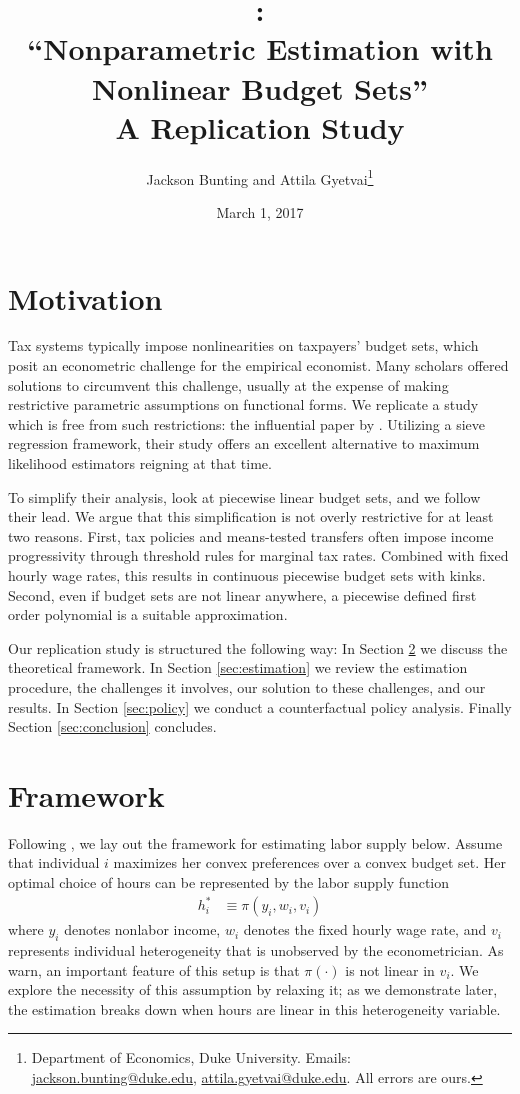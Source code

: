 \documentclass[11pt,letterpaper]{article}                  %
\title{\citet{Blomquist2002}: \\ ``Nonparametric Estimation with Nonlinear Budget Sets'' \\ \smallskip \Large{A Replication Study}}
\author{Jackson Bunting and Attila Gyetvai\footnote{Department of Economics, Duke University. Emails: \href{mailto:jackson.bunting@duke.edu}{jackson.bunting@duke.edu}, \href{mailto:attila.gyetvai@duke.edu}{attila.gyetvai@duke.edu}. All errors are ours.}}
\date{March 1, 2017}
\begin{document}
\maketitle

\section{Motivation}

Tax systems typically impose nonlinearities on taxpayers' budget sets, which posit an econometric challenge for the empirical economist.
Many scholars offered solutions to circumvent this challenge, usually at the expense of making restrictive parametric assumptions on functional forms.
We replicate a study which is free from such restrictions: the influential paper by \citet{Blomquist2002}.
Utilizing a sieve regression framework, their study offers an excellent alternative to maximum likelihood estimators reigning at that time.

To simplify their analysis, \citet{Blomquist2002} look at piecewise linear budget sets, and we follow their lead.
We argue that this simplification is not overly restrictive for at least two reasons.
First, tax policies and means-tested transfers often impose income progressivity through threshold rules for marginal tax rates.
Combined with fixed hourly wage rates, this results in continuous piecewise budget sets with kinks.
Second, even if budget sets are not linear anywhere, a piecewise defined first order polynomial is a suitable approximation.

Our replication study is structured the following way:
In Section \ref{sec:framework} we discuss the theoretical framework.
In Section \ref{sec:estimation} we review the estimation procedure, the challenges it involves, our solution to these challenges, and our results.
In Section \ref{sec:policy} we conduct a counterfactual policy analysis.
Finally Section \ref{sec:conclusion} concludes.

\newpage

\section{Framework}
\label{sec:framework}

Following \citet{Blomquist2002}, we lay out the framework for estimating labor supply below.
Assume that individual $i$ maximizes her convex preferences over a convex budget set.
Her optimal choice of hours can be represented by the labor supply function
\begin{align*}
	h_i^* &\equiv \pi (y_i, w_i, v_i)
\end{align*}
where $y_i$ denotes nonlabor income, $w_i$ denotes the fixed hourly wage rate, and $v_i$ represents individual heterogeneity that is unobserved by the econometrician.
As \citet{Blomquist2002} warn, an important feature of this setup is that $\pi(\cdot)$ is not linear in $v_i$.
We explore the necessity of this assumption by relaxing it; as we demonstrate later, the estimation breaks down when hours are linear in this heterogeneity variable.
\end{document}
